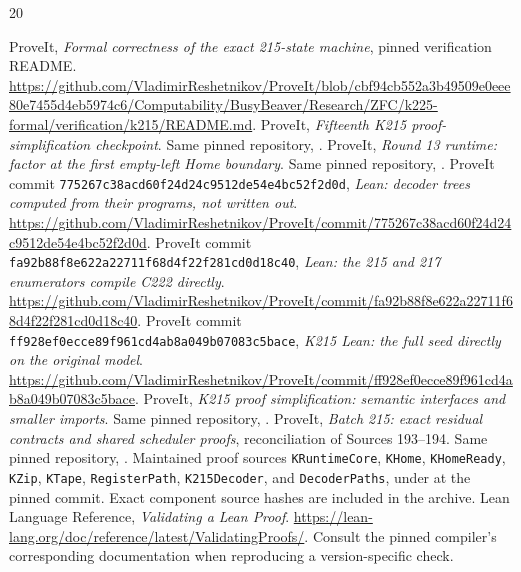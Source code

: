 \documentclass[11pt]{article}
\theoremstyle{definition}\newtheorem{definition}[theorem]{Definition}
\theoremstyle{remark}\newtheorem{remark}[theorem]{Remark}
\newcommand{\code}[1]{\nolinkurl{#1}}
\begin{document}
\begin{thebibliography}{20}
\raggedright
{} ProveIt, \emph{Formal correctness of the exact 215-state machine}, pinned verification README. \url{https://github.com/VladimirReshetnikov/ProveIt/blob/cbf94cb552a3b49509e0eee80e7455d4eb5974c6/Computability/BusyBeaver/Research/ZFC/k225-formal/verification/k215/README.md}.
 ProveIt, \emph{Fifteenth K215 proof-simplification checkpoint}. Same pinned repository, .
 ProveIt, \emph{Round 13 runtime: factor at the first empty-left Home boundary}. Same pinned repository, .
 ProveIt commit \code{775267c38acd60f24d24c9512de54e4bc52f2d0d}, \emph{Lean: decoder trees computed from their programs, not written out}. \url{https://github.com/VladimirReshetnikov/ProveIt/commit/775267c38acd60f24d24c9512de54e4bc52f2d0d}.
 ProveIt commit \code{fa92b88f8e622a22711f68d4f22f281cd0d18c40}, \emph{Lean: the 215 and 217 enumerators compile C222 directly}. \url{https://github.com/VladimirReshetnikov/ProveIt/commit/fa92b88f8e622a22711f68d4f22f281cd0d18c40}.
 ProveIt commit \code{ff928ef0ecce89f961cd4ab8a049b07083c5bace}, \emph{K215 Lean: the full seed directly on the original model}. \url{https://github.com/VladimirReshetnikov/ProveIt/commit/ff928ef0ecce89f961cd4ab8a049b07083c5bace}.
 ProveIt, \emph{K215 proof simplification: semantic interfaces and smaller imports}. Same pinned repository, .
 ProveIt, \emph{Batch 215: exact residual contracts and shared scheduler proofs}, reconciliation of Sources 193--194. Same pinned repository, .
 Maintained proof sources \code{KRuntimeCore}, \code{KHome}, \code{KHomeReady}, \code{KZip}, \code{KTape}, \code{RegisterPath}, \code{K215Decoder}, and \code{DecoderPaths}, under  at the pinned commit. Exact component source hashes are included in the archive.
 Lean Language Reference, \emph{Validating a Lean Proof}. \url{https://lean-lang.org/doc/reference/latest/ValidatingProofs/}. Consult the pinned compiler's corresponding documentation when reproducing a version-specific check.
\end{thebibliography}
\end{document}
